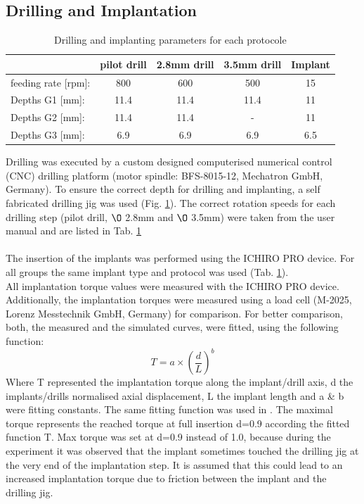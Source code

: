 \documentclass[12pt, a4paper, twoside]{report}
\begin{document}
\subsection{Drilling and Implantation}
%
%
\begin{table}[H]
\centering
\begin{tabular}{|l|c|c|c|c|}
	\hline 
	& pilot drill & 2.8mm drill & 3.5mm drill & Implant \\
	\hline
	feeding rate [rpm]: & 800 & 600 & 500 & 15 \\
	\hline
	Depths G1 [mm]: & 11.4 & 11.4 & 11.4 & 11 \\
	\hline
	Depths G2 [mm]: & 11.4 & 11.4 & - & 11 \\
	\hline
	Depths G3 [mm]: & 6.9 & 6.9 & 6.9 & 6.5 \\
	\hline
\end{tabular}
\caption{Drilling and implanting parameters for each protocole}
\label{tab:Parameters}
\end{table} 
%
%
Drilling was executed by a custom designed computerised numerical control (CNC) drilling platform (motor spindle: BFS-8015-12, Mechatron GmbH, Germany). To ensure the correct depth for drilling and implanting, a self fabricated drilling jig was used (Fig. \ref{fig:Bohrlehre}). The correct rotation speeds for each drilling step (pilot drill, $\O$ 2.8mm and $\O$ 3.5mm) were taken from the user manual and are listed in Tab. \ref{tab:Parameters}\\
\\
The insertion of the implants was performed using the ICHIRO PRO device. For all groups the same implant type and protocol was used (Tab. \ref{tab:Parameters}).
\\
All implantation torque values were measured with the ICHIRO PRO device. Additionally, the implantation torques were measured using a load cell (M-2025, Lorenz Messtechnik GmbH, Germany) for comparison. For better comparison, both, the measured and the simulated curves, were fitted, using the following function: 
%
\begin{equation*}
	T = a \times \left(\dfrac{d}{L}\right)^{b} 
\end{equation*}
%
Where T represented the implantation torque along the implant/drill axis, d the implants/drills normalised axial displacement, L the implant length and a \& b were fitting constants. The same fitting function was used in \cite{Ovesy_2019_JMechBehavBiomedMater}. The maximal torque represents the reached torque at full insertion d=0.9 according the fitted function T. Max torque was set at d=0.9 instead of 1.0, because during the experiment it was observed that the implant sometimes touched the drilling jig at the very end of the implantation step. It is assumed that this could lead to an increased implantation torque due to friction between the implant and the drilling jig.\\
% 
%
\begin{figure}[H]
\centering 
{}
\label{fig:Bohrlehre}
\end{figure}
%
\end{document}

